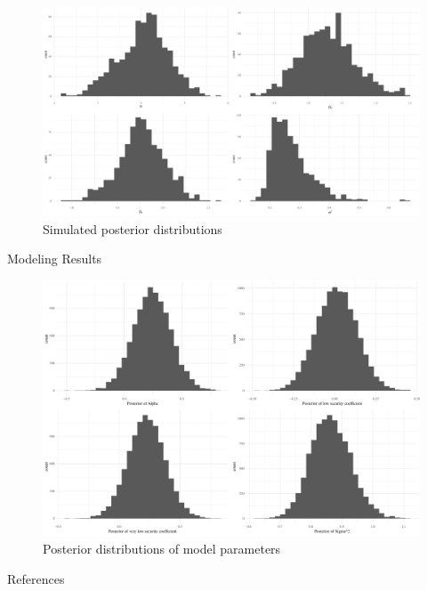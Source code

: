 \documentclass[final]{beamer}
\newlength{\onecolwid}
\begin{document}
\begin{frame}[t]
\begin{columns}[t]
\begin{column}{\onecolwid}
\begin{figure}
\includegraphics[height=0.8\linewidth,width = 1\linewidth]{sim-post.pdf}
\caption{Simulated posterior distributions}
\end{figure}

\begin{block}{Modeling Results}

\begin{figure}
\includegraphics[width=1\linewidth]{nurt_posteriors.pdf}
\caption{Posterior distributions of model parameters}
\end{figure}

\end{block}

\begin{block}{References}


\end{block}
\end{column}
\end{columns}
\end{frame}
\end{document}
